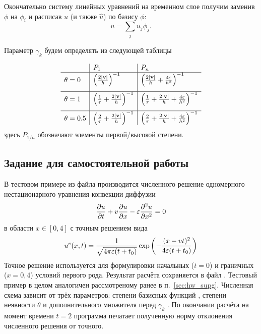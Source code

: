 Окончательно систему линейных уравнений на временном слое получим
заменив $\phi$ на $\phi_i$ и
расписав $u$ (и также $\hat u$) по базису $\phi$:
\begin{equation*}
u = \sum_j u_j \phi_j.
\end{equation*}

Параметр $\gamma_k$ будем определять из следующей таблицы

\begin{equation*}
\begin{array}{l|l|l}
             & P_1  &  P_n \\
\hline
\theta = 0   & \left(                 \frac{2 |\boldsymbol{\rm v}|}{h}                     \right)^{-1}     &  \left(                 \frac{2 |\boldsymbol{\rm v}|}{h} + \frac{4 \varepsilon}{h^2}\right)^{-1}   \\[10pt]
\hline
\theta = 1   & \left(\frac{1}{\tau} + \frac{2 |\boldsymbol{\rm v}|}{h}                     \right)^{-1}     & \left(\frac{1}{\tau} + \frac{2 |\boldsymbol{\rm v}|}{h} + \frac{4 \varepsilon}{h^2}\right)^{-1}    \\[10pt]
\hline
\theta = 0.5 & \left(\frac{2}{\tau} + \frac{2 |\boldsymbol{\rm v}|}{h}                     \right)^{-1}     & \left(\frac{2}{\tau} + \frac{2 |\boldsymbol{\rm v}|}{h} + \frac{4 \varepsilon}{h^2}\right)^{-1}
\end{array}
\end{equation*}
здесь $P_{1/n}$ обозначают элементы первой/высокой степени.

\subsection{Задание для самостоятельной работы}
В тестовом примере  из файла 
производится численного решение одномерного нестационарного уравнения конвекции-диффузии
$$
\frac{\partial u}{\partial t} + v \frac{\partial u}{\partial x} - \varepsilon \frac{\partial^2 u}{\partial x^2} = 0
$$
в области $x\in[0, 4]$
с точным решением вида
$$
u^e(x, t) = \frac{1}{\sqrt{4\pi \varepsilon (t + t_0)}} \exp\left(-\frac{(x - v t)^2}{4\varepsilon(t+t_0)}\right)
$$
Точное решение используется для формулировки начальных ($t=0$) и граничных ($x=0,4$) условий первого рода.
Результат расчёта сохраняется в файл .
Тестовый пример в целом аналогичен рассмотреному ранее в п.~\ref{sec:hw_supg}.
Численная схема зависит от трёх параметров:
степени базисных функций ,
степени неявности $\theta$
и дополнительного множителя перед $\gamma_k$  .
По окончании расчёта на момент времени $t=2$ программа печатает полученную норму отклонения численного решения от точного.


